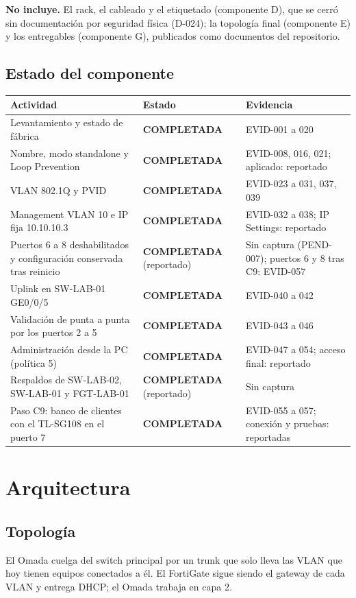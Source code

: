 \documentclass[11pt,a4paper]{article}
\newcommand{\estado}[1]{%
  \ifstrequal{#1}{COMPLETADA}{\textcolor{okgreen}{\textbf{\footnotesize #1}}}{%
  \ifstrequal{#1}{OPERATIVO VALIDADO}{\textcolor{okgreen}{\textbf{\footnotesize #1}}}{%
  \ifstrequal{#1}{OK}{\textcolor{okgreen}{\textbf{\footnotesize #1}}}{%
  \ifstrequal{#1}{RESUELTO}{\textcolor{okgreen}{\textbf{\footnotesize #1}}}{%
  \ifstrequal{#1}{EN CURSO}{\textcolor{amber}{\textbf{\footnotesize #1}}}{%
  \ifstrequal{#1}{REPORTADO}{\textcolor{amber}{\textbf{\footnotesize #1}}}{%
  \ifstrequal{#1}{NO EJECUTADA}{\textcolor{muted}{\textbf{\footnotesize #1}}}{%
  \ifstrequal{#1}{PROPUESTO}{\textcolor{violet}{\textbf{\footnotesize #1}}}{%
  \ifstrequal{#1}{PENDIENTE}{\textcolor{alertred}{\textbf{\footnotesize #1}}}{%
  \textbf{\footnotesize #1}}}}}}}}}}}
\newcommand{\cab}{\rowcolor{light}}
\begin{document}
\textbf{No incluye.} El rack, el cableado y el etiquetado (componente D), que se cerró sin documentación por seguridad física (D-024); la topología final (componente E) y los entregables (componente G), publicados como documentos del repositorio.

\subsection{Estado del componente}
\begin{tabularx}{\textwidth}{Z L{3.3cm} L{3.3cm}}
  \toprule
  \cab\textbf{Actividad} & \textbf{Estado} & \textbf{Evidencia}\\
  \midrule
  Levantamiento y estado de fábrica & \estado{COMPLETADA} & EVID-001 a 020\\
  Nombre, modo standalone y Loop Prevention & \estado{COMPLETADA} & EVID-008, 016, 021; aplicado: reportado\\
  VLAN 802.1Q y PVID & \estado{COMPLETADA} & EVID-023 a 031, 037, 039\\
  Management VLAN 10 e IP fija 10.10.10.3 & \estado{COMPLETADA} & EVID-032 a 038; IP Settings: reportado\\
  Puertos 6 a 8 deshabilitados y configuración conservada tras reinicio & \estado{COMPLETADA} (reportado) & Sin captura (PEND-007); puertos 6 y 8 tras C9: EVID-057\\
  Uplink en SW-LAB-01 GE0/0/5 & \estado{COMPLETADA} & EVID-040 a 042\\
  Validación de punta a punta por los puertos 2 a 5 & \estado{COMPLETADA} & EVID-043 a 046\\
  Administración desde la PC (política 5) & \estado{COMPLETADA} & EVID-047 a 054; acceso final: reportado\\
  Respaldos de SW-LAB-02, SW-LAB-01 y FGT-LAB-01 & \estado{COMPLETADA} (reportado) & Sin captura\\
  Paso C9: banco de clientes con el TL-SG108 en el puerto 7 & \estado{COMPLETADA} & EVID-055 a 057; conexión y pruebas: reportadas\\
  \bottomrule
\end{tabularx}

\section{Arquitectura}
\subsection{Topología}
El Omada cuelga del switch principal por un trunk que solo lleva las VLAN que hoy tienen equipos conectados a él. El FortiGate sigue siendo el gateway de cada VLAN y entrega DHCP; el Omada trabaja en capa 2.
\end{document}
